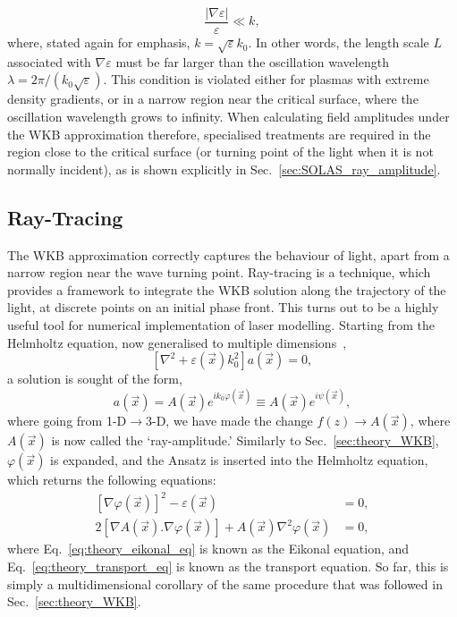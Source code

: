 \begin{equation}
    \frac{|\nabla \varepsilon|}{\varepsilon} \ll k,
\end{equation}
where, stated again for emphasis, $k=\sqrt{\varepsilon}k_0$.
In other words, the length scale $L$ associated with $\nabla\varepsilon$ must be far larger than the oscillation wavelength $\lambda = 2\pi/(k_0\sqrt{\varepsilon})$.
This condition is violated either for plasmas with extreme density gradients, or in a narrow region near the critical surface, where the oscillation wavelength grows to infinity.
When calculating field amplitudes under the WKB approximation therefore, specialised treatments are required in the region close to the critical surface (or turning point of the light when it is not normally incident), as is shown explicitly in Sec.~\ref{sec:SOLAS_ray_amplitude}.

\subsection{Ray-Tracing}%
\label{sec:theory_rays}

The WKB approximation correctly captures the behaviour of light, apart from a narrow region near the wave turning point.
Ray-tracing is a technique, which provides a framework to integrate the WKB solution along the trajectory of the light, at discrete points on an initial phase front.
This turns out to be a highly useful tool for numerical implementation of laser modelling.
Starting from the Helmholtz equation, now generalised to multiple dimensions~\cite{colaitis_modeling_2014},
\begin{equation}
    \left[ \nabla^2 + \varepsilon(\vec{x})k_0^2 \right] a(\vec{x}) = 0,
\end{equation}
a solution is sought of the form,
\begin{equation}
    a(\vec{x}) = A(\vec{x}) e^{i k_0 \varphi(\vec{x})} \equiv A(\vec{x}) e^{i \psi(\vec{x})},
\end{equation}
where going from 1-D$\rightarrow$3-D, we have made the change $f(z)\rightarrow A(\vec{x})$, where $A(\vec{x})$ is now called the `ray-amplitude.'
Similarly to Sec.~\ref{sec:theory_WKB}, $\varphi(\vec{x})$ is expanded, and the Ansatz is inserted into the Helmholtz equation, which returns the following equations:
\begin{align}
    \label{eq:theory_eikonal_eq}
    \left[\nabla \varphi(\vec{x})\right]^2  - \varepsilon(\vec{x}) &= 0,\\
    \label{eq:theory_transport_eq}
    2\left[\nabla A(\vec{x}) . \nabla \varphi (\vec{x}) \right] + A(\vec{x}) \nabla^2 \varphi(\vec{x}) &= 0,
\end{align}
where Eq.~\ref{eq:theory_eikonal_eq} is known as the Eikonal equation, and Eq.~\ref{eq:theory_transport_eq} is known as the transport equation.
So far, this is simply a multidimensional corollary of the same procedure that was followed in Sec.~\ref{sec:theory_WKB}.

